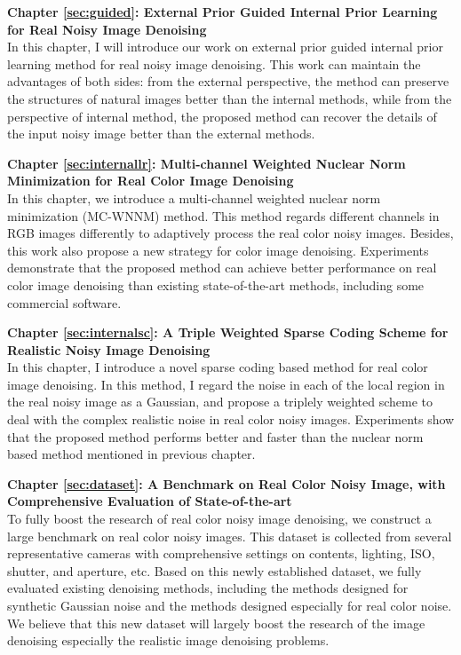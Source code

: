 \textbf{Chapter \ref{sec:guided}: External Prior Guided Internal Prior Learning for Real Noisy Image Denoising} \\[0.2em]

In this chapter, I will introduce our work on external prior guided internal prior learning method for real noisy image denoising. This work can maintain the advantages of both sides: from the external perspective, the method can preserve the structures of natural images better than the internal methods, while from the perspective of internal method, the proposed method can recover the details of the input noisy image better than the external methods.



\textbf{Chapter \ref{sec:internallr}: Multi-channel Weighted Nuclear Norm Minimization for Real Color Image Denoising} \\[0.2em]

In this chapter, we introduce a multi-channel weighted nuclear norm minimization (MC-WNNM) method. This method regards different channels in RGB images differently to adaptively process the real color noisy images. Besides, this work also propose a new strategy for color image denoising. Experiments demonstrate that the proposed method can achieve better performance on real color image denoising than existing state-of-the-art methods, including some commercial software.



\textbf{Chapter \ref{sec:internalsc}: A Triple Weighted Sparse Coding Scheme for Realistic Noisy Image Denoising} \\[0.2em]

In this chapter, I introduce a novel sparse coding based method for real color image denoising. In this method, I regard the noise in each of the local region in the real noisy image as a Gaussian, and propose a triplely weighted scheme to deal with the complex realistic noise in real color noisy images. Experiments show that the proposed method performs better and faster than the nuclear norm based method mentioned in previous chapter.


\textbf{Chapter \ref{sec:dataset}: A Benchmark on Real Color Noisy Image, with Comprehensive Evaluation of State-of-the-art} \\[0.2em]

To fully boost the research of real color noisy image denoising, we construct a large benchmark on real color noisy images. This dataset is collected from several representative cameras with comprehensive settings on contents, lighting, ISO, shutter, and aperture, etc. Based on this newly established dataset, we fully evaluated existing denoising methods, including the methods designed for synthetic Gaussian noise and the methods designed especially for real color noise. We believe that this new dataset will largely boost the research of the image denoising especially the realistic image denoising problems.





